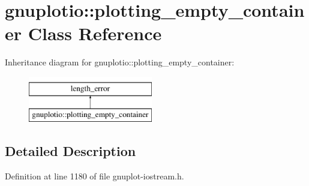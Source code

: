 \hypertarget{classgnuplotio_1_1plotting__empty__container}{}\section{gnuplotio\+:\+:plotting\+\_\+empty\+\_\+container Class Reference}
\label{classgnuplotio_1_1plotting__empty__container}
Inheritance diagram for gnuplotio\+:\+:plotting\+\_\+empty\+\_\+container\+:\begin{figure}[H]
\begin{center}
\leavevmode
\includegraphics[height=2.000000cm]{classgnuplotio_1_1plotting__empty__container}
\end{center}
\end{figure}


\subsection{Detailed Description}


Definition at line 1180 of file gnuplot-\/iostream.\+h.


